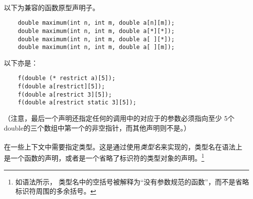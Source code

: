 \paragraph{}
\ex 以下为兼容的函数原型声明子。
\begin{lstlisting}
    double maximum(int n, int m, double a[n][m]);
    double maximum(int n, int m, double a[*][*]);
    double maximum(int n, int m, double a[ ][*]);
    double maximum(int n, int m, double a[ ][m]);
\end{lstlisting}
以下亦是：
\begin{lstlisting}
    f(double (* restrict a)[5]);
    f(double a[restrict][5]);
    f(double a[restrict 3][5]);
    f(double a[restrict static 3][5]);
\end{lstlisting}
（注意，最后一个声明还指定任何的调用中的对应于的参数必须指向至少
5个double的三个数组中第一个的非空指针，而其他声明则不是。）


\syntax
\paragraph{}

\semantic
\paragraph{}
在一些上下文中需要指定类型。这是通过使用\textit{类型名}来实现的，类型名在语法上
是一个函数的声明，或者是一个省略了标识符的类型对象的声明。\footnote{如语法所示，
类型名中的空括号被解释为``没有参数规范的函数''，而不是省略标识符周围的多余括号。
}

